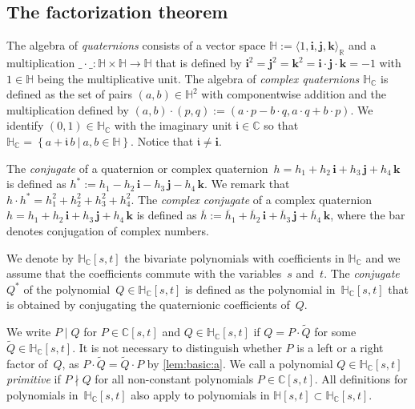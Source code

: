 \documentclass[11pt]{article}
\newcommand{\RL}[2]{\Cref{lem:#1}\ref{lem:#1:#2}}
\newcommand{\C}{\mathbb{C}}
\newcommand{\R}{\mathbb{R}}
\renewcommand{\H}{\mathbb{H}}
\newcommand{\tQ}{\tilde{Q}}
\newcommand{\oh}{{\overline{h}}}
\newcommand{\HC}{\mathbb{H}_{\C}}
\newcommand{\qi}{\mathbf{i}}
\newcommand{\qj}{\mathbf{j}}
\newcommand{\qk}{\mathbf{k}}
\newcommand{\ii}{\mathfrak{i}}
\renewcommand{\c}{\colon}
\newcommand{\set}[2]{\left\{#1 ~|~ #2\right\}}
\newcommand{\df}{\emph}
\newcommand{\bas}[1]{\langle #1\rangle}
\begin{document}
\subsection{The factorization theorem}
\label{sec:fct}
The algebra of \df{quaternions} consists of a
vector space $\H:=\bas{1,\qi,\qj,\qk}_\R$ and a multiplication $\_\cdot\_\c \H\times \H\to \H$
that is defined by $\qi^2=\qj^2=\qk^2=\qi\cdot\qj\cdot\qk=-1$ with $1\in \H$ being the multiplicative unit.
The algebra of \df{complex quaternions} $\HC$ is defined as
the set of pairs $(a,b)\in\H^2$ with componentwise addition and the multiplication defined by
$(a,b)\cdot(p,q):=(a\cdot p-b\cdot q, a\cdot q + b\cdot p)$.
We identify $(0,1)\in\HC$ with the imaginary unit $\ii\in\C$
so that $\HC=\set{a+\ii\,b}{a,b\in\H}$. Notice that $\ii\neq\qi$.

The \df{conjugate} of a quaternion or complex quaternion~$h=h_1+h_2\,\qi+h_3\,\qj+h_4\,\qk$
is defined as $h^*:=h_1-h_2\,\qi-h_3\,\qj-h_4\,\qk$.
We remark that $h\cdot h^*=h_1^2+h_2^2+h_3^2+h_4^2$.
The \df{complex conjugate} of a complex quaternion $h=h_1+h_2\,\qi+h_3\,\qj+h_4\,\qk$
is defined as $\overline{h}:=\oh_1+\oh_2\,\qi+\oh_3\,\qj+\oh_4\,\qk$,
where the bar denotes conjugation of complex numbers.

We denote by $\HC[s,t]$ the bivariate polynomials with coefficients in $\HC$
and we assume that the coefficients commute with the variables~$s$ and~$t$.
The \df{conjugate}~$Q^*$ of the polynomial~$Q\in \HC[s,t]$ is defined as the polynomial in~$\HC[s,t]$
that is obtained by conjugating the quaternionic coefficients of~$Q$.

We write $P\mid Q$ for $P\in\C[s,t]$ and $Q\in \HC[s,t]$ if $Q=P\cdot\tQ$ for some $\tQ\in\HC[s,t]$.
It is not necessary to distinguish whether $P$ is a left or a right factor of~$Q$, as
$P\cdot\tQ=\tQ\cdot P$ by \RL{basic}{a}.
We call a polynomial $Q\in\HC[s,t]$ \df{primitive} if $P\nmid Q$ for all non-constant
polynomials $P\in\C[s,t]$. All definitions for polynomials in~$\HC[s,t]$ also apply
to polynomials in $\H[s,t]\subset \HC[s,t]$.
\end{document}
